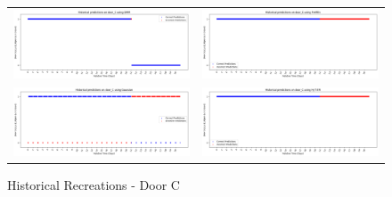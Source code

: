 \begin{figure}
  \begin{tabular}{cc}
    {\includegraphics[width = 3in]{images/results/Historical_door_C_DMM.png}} &
    {\includegraphics[width = 3in]{images/results/Historical_door_C_FreMEn.png}} \\
    {\includegraphics[width = 3in]{images/results/Historical_door_C_Gaussian.png}} &
    {\includegraphics[width = 3in]{images/results/Historical_door_C_HyT-EM.png}} \\
  \end{tabular}
  \caption{Historical Recreations - Door C}
\end{figure}\\ \\

